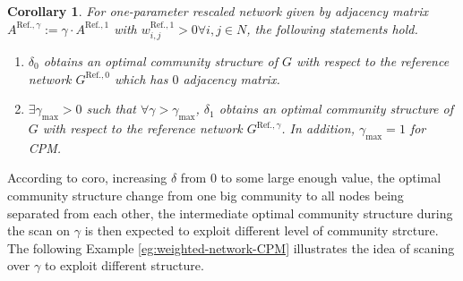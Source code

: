 \documentclass[11pt]{article}
\theoremstyle{definition}
\theoremstyle{definition}
\theoremstyle{definition}
\theoremstyle{remark}
\theoremstyle{plain}
\newtheorem{coro}[defn]{Corollary}
\begin{document}
\begin{coro}
	For one-parameter rescaled network given by adjacency matrix $A^{\text{Ref.}, \gamma} := \gamma \cdot A^{\text{Ref.}, 1}$ with $w^{\text{Ref.}, 1}_{i,j}>0 \forall i,j\in N$, the following statements hold.
	\begin{enumerate}
		\item $\delta_0$ obtains an optimal community structure of $G$ with respect to the reference network $G^{\text{Ref.}, 0}$ which has $0$ adjacency matrix.
		\item $\exists \gamma_{\max}>0$ such that $\forall \gamma >\gamma_{\max}$, $\delta_1$ obtains an optimal community structure of $G$ with respect to the reference network $G^{\text{Ref.}, \gamma}$. In addition, $\gamma_{\max} = 1$ for CPM.
	\end{enumerate}
\end{coro}

According to coro, increasing $\delta$ from $0$ to some large enough value, the optimal community structure change from one big community to all nodes being separated from each other, the intermediate optimal community structure during the scan on $\gamma$ is then expected to exploit different level of community strcture. The following Example \ref{eg:weighted-network-CPM} illustrates the idea of scaning over $\gamma$ to exploit different structure.
\end{document}
